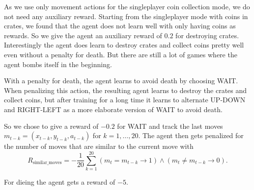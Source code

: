 
As we use only movement actions for the singleplayer coin collection mode, we do not need any auxiliary reward. Starting from the singleplayer mode with coins in crates, we found that the agent does not learn well with only having coins as rewards. So we give the agent an auxiliary reward of $0.2$ for destroying crates.
Interestingly the agent does learn to destroy crates and collect coins pretty well even without a penalty for death. But there are still a lot of games where the agent bombs itself in the beginning.

With a penalty for death, the agent learns to avoid death by choosing WAIT. When penalizing this action, the resulting agent learns to destroy the crates and collect coins, but after training for a long time it learns to alternate UP-DOWN and RIGHT-LEFT as a more elaborate version of WAIT to avoid death.

So we chose to give a reward of $-0.2$ for WAIT and track the last moves $m_{t-k} = (x_{t-k}, y_{t-k}, a_{t-k})$ for $k=1,\dots,20$. The agent then gets penalized for the number of moves that are similar to the current move with
$$
R_{\text{similar\_moves}} = - \frac{1}{20} \sum_{k=1}^{20} (m_t = m_{t-k} \rightarrow 1) \land(m_t \neq m_{t-k} \rightarrow 0).
$$

For dieing the agent gets a reward of $-5$.
